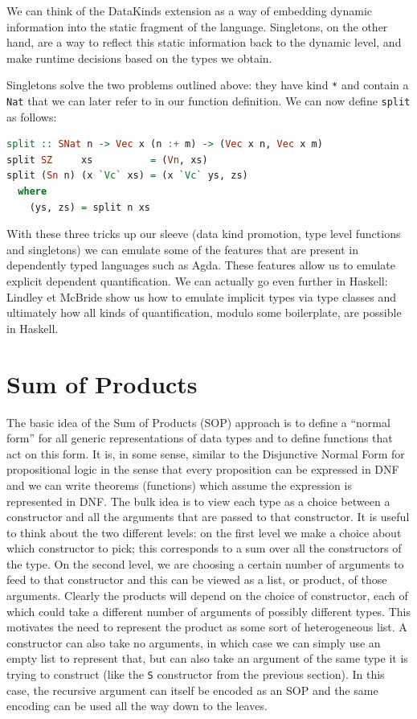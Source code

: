\documentclass[11pt]{article}
\begin{document}
We can think of the DataKinds extension as a way of embedding dynamic information into the static fragment of 
the language. Singletons, on the other hand, are a way to reflect this static information back to 
the dynamic level, and make runtime decisions based on the types we obtain.


Singletons solve the two problems outlined above: they have kind \texttt{*}
and contain a \texttt{Nat} that we can later refer to in our
function definition. We can now define \texttt{split} as follows:

\begin{lstlisting}[language=haskell]
split :: SNat n -> Vec x (n :+ m) -> (Vec x n, Vec x m)
split SZ     xs          = (Vn, xs)
split (Sn n) (x `Vc` xs) = (x `Vc` ys, zs)
  where
    (ys, zs) = split n xs
\end{lstlisting}

With these three tricks up our sleeve (data kind promotion, type level
functions and singletons) we can emulate some of the features that are
present in dependently typed languages such as Agda. These features allow us to 
emulate explicit dependent quantification. We can actually go even further in 
Haskell: Lindley et McBride \cite{hasochism} show us how to emulate implicit types via type 
classes and ultimately how all kinds of quantification, modulo some boilerplate, are possible in 
Haskell.

\section{Sum of Products}\label{SOP}


The basic idea of the Sum of Products (SOP) approach is to define a ``normal form'' for all generic representations of data types and 
to define functions that act on this form. It is, in some sense, similar to the Disjunctive Normal Form for propositional logic in the 
sense that every proposition can be expressed in DNF and we can write theorems (functions) 
which assume the expression is represented in DNF.
The bulk idea is to view each type as a choice between a constructor and all the arguments that are passed to
that constructor. It is useful to think about the two different levels: on the first level we 
make a choice about which constructor to pick; this corresponds to a sum
over all the constructors of the type. On the second level, we are choosing a certain number of arguments 
to feed to that constructor and this can be viewed as a list, or product, of 
those arguments. Clearly the products will depend on the choice of constructor, 
each of which could take a different number of arguments of possibly 
different types. This motivates the need to represent the product as some sort 
of heterogeneous list. A constructor can also take no arguments, in which case we 
can simply use an empty list to represent that, but can also take an argument of 
the same type it is trying to construct (like the \texttt{S} constructor from the previous section). 
In this case, the recursive argument can itself be encoded as an SOP 
and the same encoding can be used all the way down to the leaves. 
\end{document}
